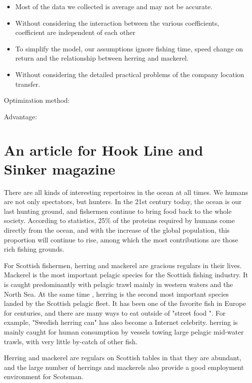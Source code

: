 \documentclass{mcmthesis}
\begin{document}
\begin{itemize}
  \item Most of the data we collected is average and may not be accurate.
   \item Without considering the interaction between the various coefficients, coefficient  are independent of each other
   \item To simplify the model, our assumptions ignore fishing time, speed change on return and the relationship between herring and mackerel.
     \item Without considering the detailed practical problems of the company location transfer.

\end{itemize}

 Optimization method: 

Advantage: 

\section{An article for Hook Line and Sinker magazine}
There are all kinds of interesting repertoires in the ocean at all times. We humans are not only spectators, but hunters. In the 21st century today, the ocean is our last hunting ground, and fishermen continue to bring food back to the whole society. According to statistics, 25\% of the proteins required by humans come directly from the ocean, and with the increase of the global population, this proportion will continue to rise, among which the most contributions are those rich fishing grounds.

For Scottish fishermen, herring and mackerel are gracious regulars in their lives. Mackerel is the most important pelagic species for the Scottish fishing industry. It is caught predominantly with pelagic trawl mainly in western waters and the North Sea.
At the same time , herring is the second most important species landed by the Scottish pelagic fleet. It has been one of the favorite fish in Europe for centuries, and there are many ways to eat outside of "street food ". For example, "Swedish herring can" has also become a Internet celebrity. herring is mainly caught for human consumption by vessels towing large pelagic mid-water trawls, with very little by-catch of other fish. 

Herring and mackerel are regulars on Scottish tables in that they are abundant, and the large number of herrings and mackerels also provide a good employment environment for Scotsman.
\end{document}
